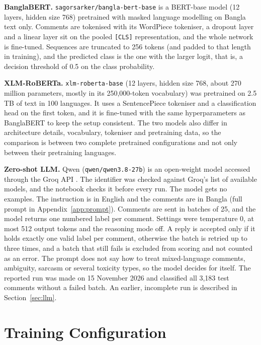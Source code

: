 \textbf{BanglaBERT.} \texttt{sagorsarker/bangla-bert-base} \cite{sarker2020banglabert} is a BERT-base model (12 layers, hidden size 768) pretrained with masked language modelling on Bangla text only. Comments are tokenised with its WordPiece tokeniser, a dropout layer and a linear layer sit on the pooled \texttt{[CLS]} representation, and the whole network is fine-tuned. Sequences are truncated to 256 tokens (and padded to that length in training), and the predicted class is the one with the larger logit, that is, a decision threshold of 0.5 on the class probability.

\textbf{XLM-RoBERTa.} \texttt{xlm-roberta-base} \cite{conneau2020xlmr} (12 layers, hidden size 768, about 270 million parameters, mostly in its 250,000-token vocabulary) was pretrained on 2.5 TB of text in 100 languages. It uses a SentencePiece tokeniser and a classification head on the first token, and it is fine-tuned with the same hyperparameters as BanglaBERT to keep the setup consistent. The two models also differ in architecture details, vocabulary, tokeniser and pretraining data, so the comparison is between two complete pretrained configurations and not only between their pretraining languages.

\textbf{Zero-shot LLM.} Qwen (\texttt{qwen/qwen3.8-27b}) \cite{yang2025qwen3} is an open-weight model accessed through the Groq API \cite{groqmodels}. The identifier was checked against Groq's list of available models, and the notebook checks it before every run. The model gets no examples. The instruction is in English and the comments are in Bangla (full prompt in Appendix~\ref{app:prompt}). Comments are sent in batches of 25, and the model returns one numbered label per comment. Settings were temperature 0, at most 512 output tokens and the reasoning mode off. A reply is accepted only if it holds exactly one valid label per comment, otherwise the batch is retried up to three times, and a batch that still fails is excluded from scoring and not counted as an error. The prompt does not say how to treat mixed-language comments, ambiguity, sarcasm or several toxicity types, so the model decides for itself. The reported run was made on 15 November 2026 and classified all 3,183 test comments without a failed batch. An earlier, incomplete run is described in Section~\ref{sec:llm}.

\section{Training Configuration}

